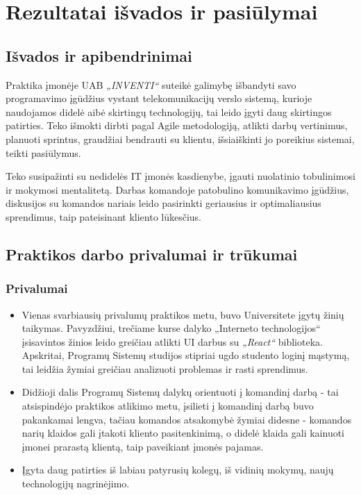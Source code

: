 \section{Rezultatai išvados ir pasiūlymai}

\subsection{Išvados ir apibendrinimai}

Praktika įmonėje UAB \textit{„INVENTI“} suteikė galimybę išbandyti savo programavimo įgūdžius vystant telekomunikacijų verslo sistemą,
kurioje naudojamos didelė aibė skirtingų technologijų, tai leido įgyti daug skirtingos patirties. Teko išmokti dirbti pagal Agile metodologiją,
atlikti darbų vertinimus, planuoti sprintus, graudžiai bendrauti su klientu, išsiaiškinti jo poreikius sistemai, teikti pasiūlymus.

Teko susipažinti su nedidelės IT įmonės kasdienybe, įgauti nuolatinio tobulinimosi ir mokymosi mentalitetą. Darbas komandoje patobulino komunikavimo įgūdžius,
diskusijos su komandos nariais leido pasirinkti geriausius ir optimaliausius sprendimus, taip pateisinant kliento lūkesčius.

\subsection{Praktikos darbo privalumai ir trūkumai}

\subsubsection{Privalumai}

\begin{itemize}
    \item Vienas svarbiausių privalumų praktikos metu, buvo Universitete įgytų žinių taikymas. Pavyzdžiui, trečiame kurse dalyko „Interneto technologijos“ įsisavintos žinios leido greičiau
    atlikti UI darbus su \textit{„React“} biblioteka. Apskritai, Programų Sistemų studijos stipriai ugdo studento loginį mąstymą, tai leidžia žymiai greičiau
    analizuoti problemas ir rasti sprendimus.
    \item Didžioji dalis Programų Sistemų dalykų orientuoti į komandinį darbą - tai atsispindėjo praktikos atlikimo metu, įsilieti į komandinį darbą buvo pakankamai lengva,
    tačiau komandos atsakomybė žymiai didesne - komandos narių klaidos gali įtakoti kliento pasitenkinimą, o didelė klaida gali kainuoti įmonei prarastą klientą, taip paveikiant
    įmonės pajamas.
    \item Įgyta daug patirties iš labiau patyrusių kolegų, iš vidinių mokymų, naujų technologijų nagrinėjimo.
\end{itemize}

